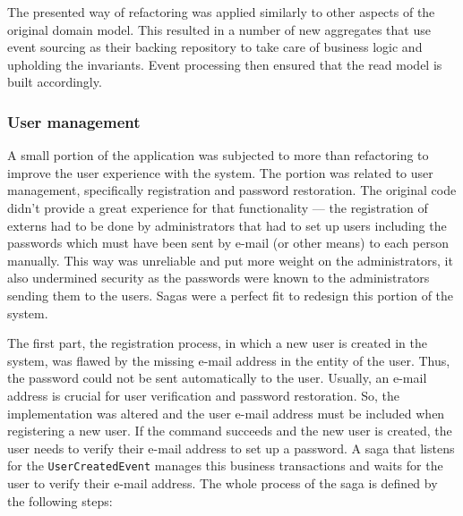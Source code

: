 \documentclass{book}
\begin{document}
The presented way of refactoring was applied similarly to other aspects
of the original domain model. This resulted in a number of new
aggregates that use event sourcing as their backing repository to take
care of business logic and upholding the invariants. Event processing
then ensured that the read model is built accordingly.


\subsubsection{User management}\label{user-management}

A small portion of the application was subjected to more than
refactoring to improve the user experience with the system. The portion
was related to user management, specifically registration and password
restoration. The original code didn't provide a great experience for
that functionality --- the registration of externs had to be done by
administrators that had to set up users including the passwords which
must have been sent by e-mail (or other means) to each person manually.
This way was unreliable and put more weight on the administrators, it
also undermined security as the passwords were known to the
administrators sending them to the users. Sagas were a perfect fit to
redesign this portion of the system.

The first part, the registration process, in which a new user is created
in the system, was flawed by the missing e-mail address in the entity of
the user. Thus, the password could not be sent automatically to the
user. Usually, an e-mail address is crucial for user verification and
password restoration. So, the implementation was altered and the user
e-mail address must be included when registering a new user. If the
command succeeds and the new user is created, the user needs to verify
their e-mail address to set up a password. A saga that listens for the
\texttt{UserCreatedEvent} manages this business transactions and waits
for the user to verify their e-mail address. The whole process of the
saga is defined by the following steps:
\end{document}
